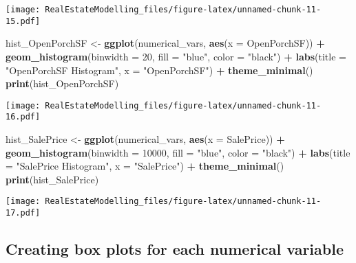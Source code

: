 \documentclass[
]{article}
\newenvironment{Shaded}{\begin{snugshade}}{\end{snugshade}}
\newcommand{\AttributeTok}[1]{\textcolor[rgb]{0.13,0.29,0.53}{#1}}
\newcommand{\DecValTok}[1]{\textcolor[rgb]{0.00,0.00,0.81}{#1}}
\newcommand{\FunctionTok}[1]{\textcolor[rgb]{0.13,0.29,0.53}{\textbf{#1}}}
\newcommand{\NormalTok}[1]{#1}
\newcommand{\OtherTok}[1]{\textcolor[rgb]{0.56,0.35,0.01}{#1}}
\newcommand{\SpecialCharTok}[1]{\textcolor[rgb]{0.81,0.36,0.00}{\textbf{#1}}}
\newcommand{\StringTok}[1]{\textcolor[rgb]{0.31,0.60,0.02}{#1}}
\begin{document}
\texttt{[image: RealEstateModelling\_files/figure-latex/unnamed-chunk-11-15.pdf]}

\begin{Shaded}
\begin{Highlighting}[]
\NormalTok{hist\_OpenPorchSF }\OtherTok{\textless{}{-}} \FunctionTok{ggplot}\NormalTok{(numerical\_vars, }\FunctionTok{aes}\NormalTok{(}\AttributeTok{x =}\NormalTok{ OpenPorchSF)) }\SpecialCharTok{+}
  \FunctionTok{geom\_histogram}\NormalTok{(}\AttributeTok{binwidth =} \DecValTok{20}\NormalTok{, }\AttributeTok{fill =} \StringTok{"blue"}\NormalTok{, }\AttributeTok{color =} \StringTok{"black"}\NormalTok{) }\SpecialCharTok{+}
  \FunctionTok{labs}\NormalTok{(}\AttributeTok{title =} \StringTok{"OpenPorchSF Histogram"}\NormalTok{, }\AttributeTok{x =} \StringTok{"OpenPorchSF"}\NormalTok{) }\SpecialCharTok{+}
  \FunctionTok{theme\_minimal}\NormalTok{()}
\FunctionTok{print}\NormalTok{(hist\_OpenPorchSF)}
\end{Highlighting}
\end{Shaded}

\texttt{[image: RealEstateModelling\_files/figure-latex/unnamed-chunk-11-16.pdf]}

\begin{Shaded}
\begin{Highlighting}[]
\NormalTok{hist\_SalePrice }\OtherTok{\textless{}{-}} \FunctionTok{ggplot}\NormalTok{(numerical\_vars, }\FunctionTok{aes}\NormalTok{(}\AttributeTok{x =}\NormalTok{ SalePrice)) }\SpecialCharTok{+}
  \FunctionTok{geom\_histogram}\NormalTok{(}\AttributeTok{binwidth =} \DecValTok{10000}\NormalTok{, }\AttributeTok{fill =} \StringTok{"blue"}\NormalTok{, }\AttributeTok{color =} \StringTok{"black"}\NormalTok{) }\SpecialCharTok{+}
  \FunctionTok{labs}\NormalTok{(}\AttributeTok{title =} \StringTok{"SalePrice Histogram"}\NormalTok{, }\AttributeTok{x =} \StringTok{"SalePrice"}\NormalTok{) }\SpecialCharTok{+}
  \FunctionTok{theme\_minimal}\NormalTok{()}
\FunctionTok{print}\NormalTok{(hist\_SalePrice)}
\end{Highlighting}
\end{Shaded}

\texttt{[image: RealEstateModelling\_files/figure-latex/unnamed-chunk-11-17.pdf]}

\hypertarget{creating-box-plots-for-each-numerical-variable}{%
\subsection{Creating box plots for each numerical
variable}\label{creating-box-plots-for-each-numerical-variable}}
\end{document}
